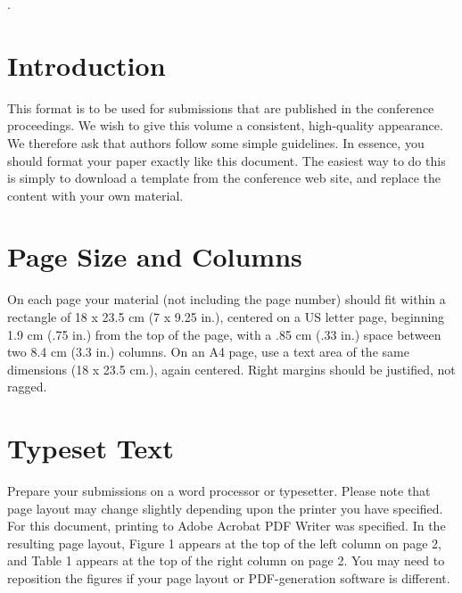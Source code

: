 \documentclass{ubicomp2010}
\begin{document}

.


\section{Introduction}

This format is to be used for submissions that are published in the
conference proceedings.  We wish to give this volume a consistent,
high-quality appearance. We therefore ask that authors follow some
simple guidelines. In essence, you should format your paper exactly
like this document. The easiest way to do this is simply to download
a template from the conference web site, and replace the content
with your own material.
\section{Page Size and Columns}

On each page your material (not including the page number) should fit
within a rectangle of 18 x 23.5 cm (7 x 9.25 in.), centered on a US
letter page, beginning 1.9 cm (.75 in.) from the top of the page, with
a .85 cm (.33 in.) space between two 8.4 cm (3.3 in.) columns.  On an
A4 page, use a text area of the same dimensions (18 x 23.5 cm.), again
centered.  Right margins should be justified, not ragged.

\section{Typeset Text}

Prepare your submissions on a word processor or typesetter. Please note that page layout may change slightly depending upon the printer you have specified. For this document, printing to Adobe Acrobat PDF Writer was specified. In the resulting page layout, Figure 1 appears at the top of the left column on page 2, and Table 1 appears at the top of the right column on page 2. You may need to reposition the figures if your page layout or PDF-generation software is different.
\end{document}
